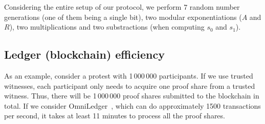 Considering the entire setup of our protocol, we perform 7 random number generations (one of them being a single bit), two modular exponentiations ($A$ and $R$), two multiplications and two substractions (when computing $s_0$ and $s_1$). 


\subsection{Ledger (blockchain) efficiency}
As an example, consider a protest with 1\,000\,000 participants.
If we use trusted witnesses, each participant only needs to acquire one proof share from a trusted witness.
Thus, there will be 1\,000\,000 proof shares submitted to the blockchain in total.
If we consider OmniLedger~\cite{OmniLedger}, which can do approximately 1500 transactions per second, it takes at least 11 minutes to process all the proof shares.

